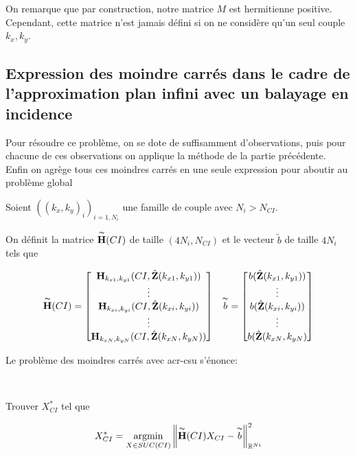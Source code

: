   On remarque que par construction, notre matrice \(M\) est hermitienne positive. Cependant, cette matrice n'est jamais défini si on ne considère qu'un seul couple \(k_x, k_y\).

\subsection{Expression des moindre carrés dans le cadre de l'approximation plan infini avec un balayage en incidence}

  Pour résoudre ce problème, on se dote de suffisamment d'observations, puis pour chacune de ces observations on applique la méthode de la partie précédente. Enfin on agrège tous ces moindres carrés en une seule expression pour aboutir au problème global

  Soient \(((k_x,k_y)_i)_{i=1,N_{i}}\) une famille de couple avec \(N_{i} > N_{CI}\).

  \begin{defn}
    On définit la matrice \(\overset{\thicksim}{\mathbf{H}}(CI)\) de taille \((4N_{i},N_{CI})\) et le vecteur \(\tilde{b}\) de taille \(4N_{i}\) tels que

  \begin{align}
    \overset{\thicksim}{\mathbf{H}}(CI) = \begin{bmatrix}
      \mathbf{H}_{k_{x1},k_{y1}} (CI,\hat{\mathbf{Z}}(k_{x1},k_{y1}))
      \\
      \vdots
      \\
      \mathbf{H}_{k_{xi},k_{yi}} (CI,\hat{\mathbf{Z}}(k_{xi},k_{yi}))
      \\
      \vdots
      \\
      \mathbf{H}_{k_{xN},k_{yN}} (CI,\hat{\mathbf{Z}}(k_{xN},k_{yN}))
      \end{bmatrix}
    &&
    \overset{\thicksim}{b} = \begin{bmatrix}
     b(\hat{\mathbf{Z}}(k_{x1},k_{y1}))
     \\ 
     \vdots 
     \\ 
     b(\hat{\mathbf{Z}}(k_{xi},k_{yi}))
     \\
     \vdots
     \\ 
     b(\hat{\mathbf{Z}}(k_{xN},k_{yN})
     \end{bmatrix}
  \end{align}
  \end{defn}

  Le problème des moindres carrés avec \gls{acr-csu} s'énonce:

  \begin{prop}
  ~

  Trouver \(X_{CI}^*\) tel que

  \[
    X_{CI}^* = {\underset{X \in SUC(CI)}{\operatorname{argmin}}} \left\lVert \overset{\thicksim}{\mathbf{H}}(CI)X_{CI} - \overset{\thicksim}{b}\right\rVert^2_{\mathbb R^{Ni}}
  \]
  \end{prop}


